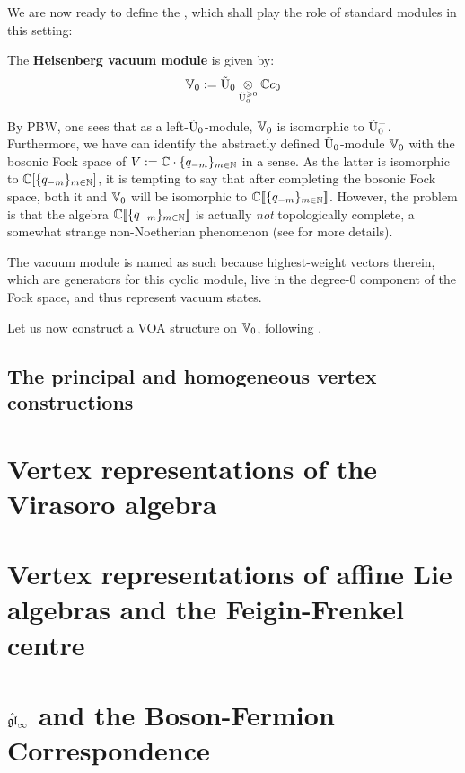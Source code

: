             We are now ready to define the , which shall play the role of standard modules in this setting:
            \begin{definition} \label{def: heisenberg_vacuum_module}
                The \textbf{Heisenberg vacuum module} is given by:
                    $$\V_0 := \tilde{\rmU}_0 \tensor_{\tilde{\rmU}_0^{\geq 0}} \bbC c_0$$
            \end{definition}
            By PBW, one sees that as a left-$\tilde{\mathrm{U}}_0$-module, $\mathbb{V}_0$ is isomorphic to $\tilde{\mathrm{U}}_0^-$. Furthermore, we have can identify the abstractly defined $\tilde{\mathrm{U}}_0$-module $\mathbb{V}_0$ with the bosonic Fock space of $V := \mathbb{C} \cdot \{q_{-m}\}_{m \in \mathbb{N}}$ in a sense. As the latter is isomorphic to $\mathbb{C}[\{q_{-m}\}_{m \in \mathbb{N}}]$, it is tempting to say that after completing the bosonic Fock space, both it and $\mathbb{V}_0$ will be isomorphic to $\mathbb{C}[\![  \{q_{-m}\}_{m \in \mathbb{N}} ]\!]$. However, the problem is that the algebra $\mathbb{C}[\![  \{q_{-m}\}_{m \in \mathbb{N}} ]\!]$ is actually \textit{not} topologically complete, a somewhat strange non-Noetherian phenomenon (see \cite[\href{https://stacks.math.columbia.edu/tag/05JA}{Tag 05JA}]{stacks} for more details).  
            \begin{remark}
                The vacuum module is named as such because highest-weight vectors therein, which are generators for this cyclic module, live in the degree-$0$ component of the Fock space, and thus represent vacuum states. 
            \end{remark}

            Let us now construct a VOA structure on $\mathbb{V}_0$, following \cite[Section 2.2]{frenkel_ben_zvi_vertex_algebras_and_algebraic_curves}. 
    
        \subsection{The principal and homogeneous vertex constructions}

    \section{Vertex representations of the Virasoro algebra}

    \section{Vertex representations of affine Lie algebras and the Feigin-Frenkel centre}

    \section{\texorpdfstring{$\hat{\mathfrak{gl}}_{\infty}$}{} and the Boson-Fermion Correspondence}
    
    \printbibliography

